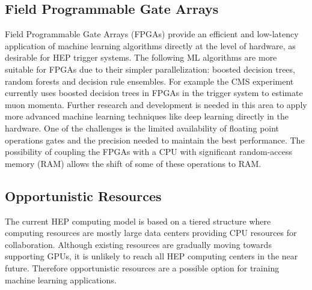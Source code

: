 

\subsection{Field Programmable Gate Arrays}
Field Programmable Gate Arrays (FPGAs) provide an efficient and low-latency application of machine learning algorithms directly at the level of hardware, as desirable for HEP trigger systems. The following ML algorithms are more suitable for FPGAs due to their simpler parallelization: boosted decision trees, random forests and decision rule ensembles. For example the CMS experiment currently uses boosted decision trees in FPGAs in the trigger system to estimate muon momenta. Further research and development is needed in this area to apply more advanced machine learning techniques like deep learning directly in the hardware. One of the challenges is the limited availability of floating point operations gates and the precision needed to maintain the best performance. The possibility of coupling the FPGAs with a CPU with significant random-access memory (RAM) allows the shift of some of these operations to RAM.


\subsection{Opportunistic Resources}
The current HEP computing model is based on a tiered structure where computing resources are mostly large data centers providing CPU resources for collaboration. Although existing resources are gradually moving towards supporting GPUs, it is unlikely to reach all HEP computing centers in the near future. Therefore opportunistic resources are a possible option for training machine learning applications.


